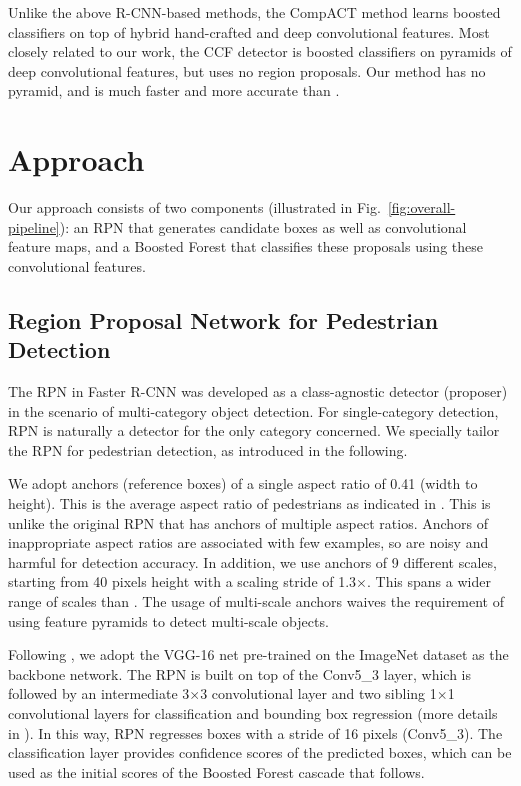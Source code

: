 \documentclass[runningheads]{llncs}
\begin{document}
Unlike the above R-CNN-based methods, the CompACT method \cite{cai2015learning} learns boosted classifiers on top of hybrid hand-crafted and deep convolutional features. Most closely related to our work, the CCF detector \cite{yang2015convolutional} is boosted classifiers on pyramids of deep convolutional features, but uses no region proposals. Our method has no pyramid, and is much faster and more accurate than \cite{yang2015convolutional}.

\section{Approach}

Our approach consists of two components (illustrated in Fig.~\ref{fig:overall-pipeline}): an RPN that generates candidate boxes as well as convolutional feature maps, and a Boosted Forest that classifies these proposals using these convolutional features.

\subsection{Region Proposal Network for Pedestrian Detection}

The RPN in Faster R-CNN \cite{ren2015faster} was developed as a class-agnostic detector (proposer) in the scenario of multi-category object detection. For single-category detection, RPN is naturally a detector for the only category concerned. We specially tailor the RPN for pedestrian detection, as introduced in the following. 

We adopt anchors (reference boxes) \cite{ren2015faster} of a single aspect ratio of 0.41 (width to height). This is the average aspect ratio of pedestrians as indicated in \cite{dollar2012pedestrian}. This is unlike the original RPN \cite{ren2015faster} that has anchors of multiple aspect ratios. Anchors of inappropriate aspect ratios are associated with few examples, so are noisy and harmful for detection accuracy.
In addition, we use anchors of 9 different scales, starting from 40 pixels height with a scaling stride of 1.3$\times$. This spans a wider range of scales than \cite{ren2015faster}. The usage of multi-scale anchors waives the requirement of using feature pyramids to detect multi-scale objects.

Following \cite{ren2015faster}, we adopt the VGG-16 net \cite{simonyan2014very} pre-trained on the ImageNet dataset \cite{ILSVRC15} as the backbone network. The RPN is built on top of the Conv5\_3 layer, which is followed by an intermediate 3$\times$3 convolutional layer and two sibling 1$\times$1 convolutional layers for classification and bounding box regression (more details in \cite{ren2015faster}). In this way, RPN regresses boxes with a stride of 16 pixels (Conv5\_3). The classification layer provides confidence scores of the predicted boxes, which can be used as the initial scores of the Boosted Forest cascade that follows.
\end{document}
